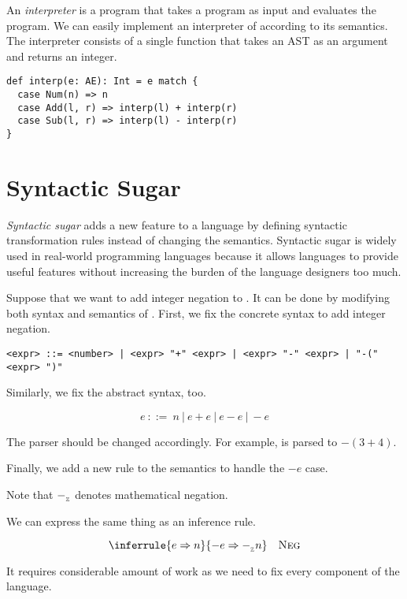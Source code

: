 An \textit{interpreter} is a program that takes a program as
input and evaluates the program. We can easily implement an interpreter of
\Lang according to its semantics. The interpreter consists of a single function
that takes an AST as an argument and returns an integer.

\begin{verbatim}
def interp(e: AE): Int = e match {
  case Num(n) => n
  case Add(l, r) => interp(l) + interp(r)
  case Sub(l, r) => interp(l) - interp(r)
}
\end{verbatim}

\section{Syntactic Sugar}

\textit{Syntactic sugar} adds a new feature to a language
by defining syntactic transformation rules instead of changing the semantics.
Syntactic sugar is widely used in real-world programming languages because it
allows languages to provide useful features without increasing the burden of the
language designers too much.

Suppose that we want to add integer negation to \Lang. It can be done by
modifying both syntax and semantics of \Lang. First, we fix the concrete syntax
to add integer negation.

\begin{verbatim}
<expr> ::= <number> | <expr> "+" <expr> | <expr> "-" <expr> | "-(" <expr> ")"
\end{verbatim}

Similarly, we fix the abstract syntax, too.

\[e\ ::=\ n\ |\ e+e\ |\ e-e\ |\ -e\]

The parser should be changed accordingly. For example,  is parsed
to $-(3+4)$.

Finally, we add a new rule to the semantics to handle the $-e$ case.


Note that $-_{{}_{\mathbb{Z}}}$ denotes mathematical negation.

We can express the same thing as an inference rule.

\[
  \inferrule
  { e\Rightarrow n}
  { -e\Rightarrow\isub n }
  \quad\textsc{Neg}
\]

It requires considerable amount of work as we need to fix every component of the language.

